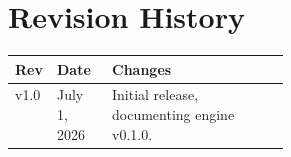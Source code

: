 \documentclass[10pt,letterpaper]{article}
\begin{document}
\section{Revision History}
\begin{tabularx}{\linewidth}{L{0.12\linewidth} L{0.20\linewidth} Y}
\toprule
\textbf{Rev} & \textbf{Date} & \textbf{Changes} \\
\midrule
v1.0 & July 1, 2026 & Initial release, documenting engine v0.1.0. \\
\bottomrule
\end{tabularx}
\end{document}
